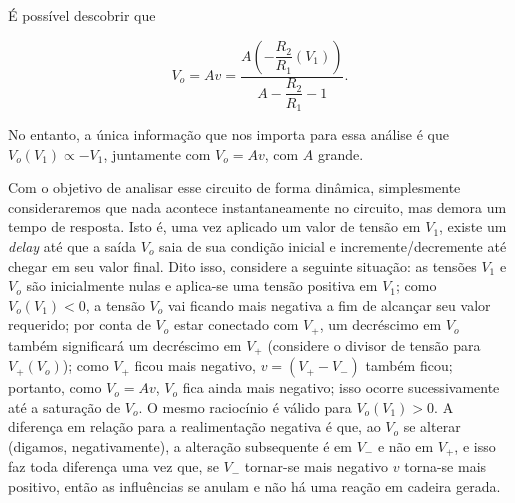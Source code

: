 \documentclass{article}
\numberwithin{equation}{section}
\let\dfr\dfrac
\begin{document}
\begin{center}
\end{center}

\noindent É possível descobrir que

\begin{equation}
    V_o = Av = \dfr{A\left(-\dfr{R_2}{R_1}\left(V_1\right)\right)}{A-\dfr{R_2}{R_1}-1}.
\end{equation}

\noindent No entanto, a única informação que nos importa para essa análise é que $V_o(V_1) \propto -V_1$, juntamente com $V_o = Av$, com $A$ grande.

Com o objetivo de analisar esse circuito de forma dinâmica, simplesmente consideraremos que nada acontece instantaneamente no circuito, mas demora um tempo de resposta. Isto é, uma vez aplicado um valor de tensão em $V_1$, existe um \textit{delay} até que a saída $V_o$ saia de sua condição inicial e incremente/decremente até chegar em seu valor final. Dito isso, considere a seguinte situação: as tensões $V_1$ e $V_o$ são inicialmente nulas e aplica-se uma tensão positiva em $V_1$; como $V_o(V_1) < 0$, a tensão $V_o$ vai ficando mais negativa a fim de alcançar seu valor requerido; por conta de $V_o$ estar conectado com $V_+$, um decréscimo em $V_o$ também significará um decréscimo em $V_+$ (considere o divisor de tensão para $V_+(V_o)$); como $V_+$ ficou mais negativo, $v = (V_+-V_-)$ também ficou; portanto, como $V_o = Av$, $V_o$ fica ainda mais negativo; isso ocorre sucessivamente até a saturação de $V_o$. O mesmo raciocínio é válido para $V_o(V_1) > 0$. A diferença em relação para a realimentação negativa é que, ao $V_o$ se alterar (digamos, negativamente), a alteração subsequente é em $V_-$ e não em $V_+$, e isso faz toda diferença uma vez que, se $V_-$ tornar-se mais negativo $v$ torna-se mais positivo, então as influências se anulam e não há uma reação em cadeira gerada.

\vspace{5mm}
\end{document}
